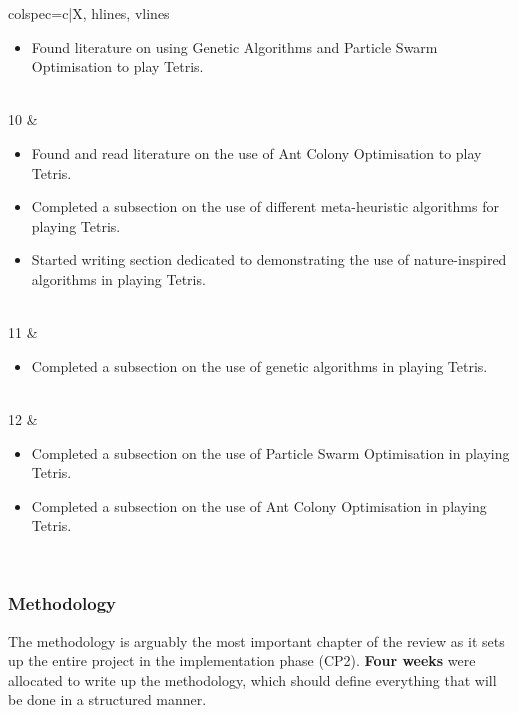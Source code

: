 \documentclass[a4paper, 12pt]{extreport}
\begin{document}
\begin{longtblr}[
		caption = Weekly breakdown of work done for Literature Review Chapter.
		]{colspec={c|X}, hlines, vlines}
\begin{varwidth}[t]{\linewidth}
\begin{itemize}[topsep=0pt,parsep=0pt]
				\item Found literature on using Genetic Algorithms and Particle Swarm Optimisation to play Tetris.
			\end{itemize}
		\end{varwidth}\\
		10 & \begin{varwidth}[t]{\linewidth}
			\begin{itemize}[topsep=0pt,parsep=0pt]
				\item Found and read literature on the use of Ant Colony Optimisation to play Tetris.
				\item Completed a subsection on the use of different meta-heuristic algorithms for playing Tetris.
				\item Started writing section dedicated to demonstrating the use of nature-inspired algorithms in playing Tetris.
			\end{itemize}
		\end{varwidth}\\
		11 & \begin{varwidth}[t]{\linewidth}
			\begin{itemize}[topsep=0pt,parsep=0pt]
				\item Completed a subsection on the use of genetic algorithms in playing Tetris.
			\end{itemize}
		\end{varwidth}\\
		12 & \begin{varwidth}[t]{\linewidth}
			\begin{itemize}[topsep=0pt,parsep=0pt]
				\item Completed a subsection on the use of Particle Swarm Optimisation in playing Tetris.
				\item Completed a subsection on the use of Ant Colony Optimisation in playing Tetris.
			\end{itemize}
		\end{varwidth}\\
	\end{longtblr}
	
	\subsubsection{Methodology}
	
	The methodology is arguably the most important chapter of the review as it sets up the entire project in the implementation phase (CP2). \textbf{Four weeks} were allocated to write up the methodology, which should define everything that will be done in a structured manner.
	
\end{document}

